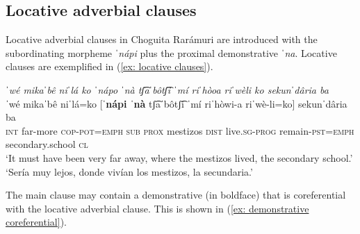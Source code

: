 \subsection{Locative adverbial clauses}
\label{subsec: locative clauses 2}

Locative adverbial clauses in Choguita Rarámuri are introduced with the subordinating morpheme \textit{ˈnápi} plus the proximal demonstrative \textit{ˈna}. Locative clauses are exemplified in (\ref{ex: locative clauses}).

\ea\label{ex: locative clauses}

\textit{ˈwé  mikaˈbê   niˈlá ko   ˈnápo  ˈnà   tʃ͡aˈbôtʃ͡i   ˈmí riˈhòoa   riˈwèli   ko    sekunˈdâria   ba}    \\
\gll    ˈwé   mikaˈbê   niˈlá=ko   [\textbf{ˈnápi  ˈnà}   tʃ͡aˈbôtʃ͡i   ˈmí riˈhòwi-a riˈwè-li=ko]         sekunˈdâria   ba\\
        \textsc{int} far-more  \textsc{cop-pot=emph} {\textsc{sub} \textsc{prox}}  mestizos   \textsc{dist}   live\textsc{.sg-prog}   remain-\textsc{pst=emph}  secondary.school   \textsc{cl}  \\
\glt    `It must have been very far away, where the mestizos lived,  the secondary school.’\\
\glt    `Sería muy lejos, donde vivían los mestizos, la secundaria.’  \\

\z

The main clause may contain a demonstrative (in boldface) that is coreferential with the locative adverbial clause. This is shown in (\ref{ex: demonstrative coreferential}).

\ea\label{ex: demonstrative coreferential}

